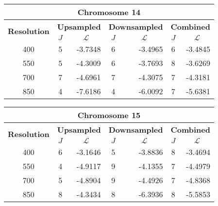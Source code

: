 \begin{table}[h!]
  \centering
\begin{tabular}{|c|c|r|c|r|c|r|}\hline
\multicolumn{7}{|c|}{\textbf{Chromosome 14}} \\ \hline
\multirow{2}{*}{\textbf{Resolution}} & \multicolumn{2}{|c|}{\textbf{Upsampled}} &  \multicolumn{2}{|c|}{\textbf{Downsampled}} &  \multicolumn{2}{|c|}{\textbf{Combined}} \\ \cline{2-7}
    & $J$ & \multicolumn{1}{|c|}{\textbf{$\mathcal{L}$}} & $J$ & \multicolumn{1}{|c|}{\textbf{$\mathcal{L}$}} &$J$ & \multicolumn{1}{|c|}{\textbf{$\mathcal{L}$}}   \\ \hline
400 & 5 & -3.7348 & 6 & -3.4965 & 6 & -3.4845  \\ \hline
550 & 5 & -4.3009 & 6 & -3.7693 & 8 & -3.6269  \\ \hline
700 & 7 & -4.6961 & 7 & -4.3075 & 7 & -4.3181  \\ \hline
850 & 4 & -7.6186 & 4 & -6.0092 & 7 & -5.6381  \\ \hline
\end{tabular}
\end{table}



\begin{table}[h!]
  \centering
\begin{tabular}{|c|c|r|c|r|c|r|}\hline
\multicolumn{7}{|c|}{\textbf{Chromosome 15}} \\ \hline
\multirow{2}{*}{\textbf{Resolution}} & \multicolumn{2}{|c|}{\textbf{Upsampled}} &  \multicolumn{2}{|c|}{\textbf{Downsampled}} &  \multicolumn{2}{|c|}{\textbf{Combined}} \\ \cline{2-7}
    & $J$ & \multicolumn{1}{|c|}{\textbf{$\mathcal{L}$}} & $J$ & \multicolumn{1}{|c|}{\textbf{$\mathcal{L}$}} &$J$ & \multicolumn{1}{|c|}{\textbf{$\mathcal{L}$}}   \\ \hline
400 & 6 & -3.1646 & 5 & -3.8836 & 8 & -3.4694  \\ \hline
550 & 4 & -4.9117 & 9 & -4.1355 & 7 & -4.4979  \\ \hline
700 & 5 & -4.8904 & 9 & -4.4926 & 7 & -4.8368 \\ \hline
850 & 8 & -4.3434 & 8 & -6.3936 & 8 & -5.5853  \\ \hline
\end{tabular}
\end{table}


